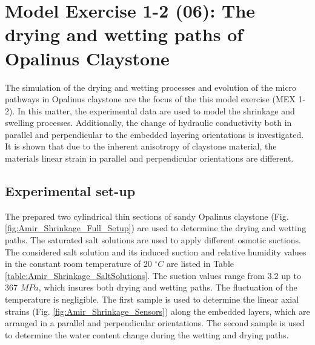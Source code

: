 \section{Model Exercise 1-2 (06): The drying and wetting paths of Opalinus Claystone}
\label{sec:mex06}

The simulation of the drying and wetting processes and evolution of the micro pathways in Opalinus claystone are the focus of the this model exercise (MEX 1-2). In this matter, the experimental data are used to model the shrinkage and swelling processes. Additionally, the change of hydraulic conductivity both in parallel and perpendicular to the embedded layering orientations is investigated. It is shown that due to the inherent anisotropy of claystone material, the materials linear strain in parallel and perpendicular orientations are different.  

\subsection{Experimental set-up}
The prepared two cylindrical thin sections of sandy Opalinus claystone (Fig. \ref{fig:Amir_Shrinkage_Full_Setup}) are used to determine the drying and wetting paths. The saturated salt solutions are used to apply different osmotic suctions. The considered salt solution and its induced suction and relative humidity values in the constant room temperature of 20 $^{\circ}C$ are listed in Table \ref{table:Amir_Shrinkage_SaltSolutions}. The suction values range from 3.2 up to 367 $MPa$, which insures both drying and wetting paths. The fluctuation of the temperature is negligible. The first sample is used to determine the linear axial strains (Fig. \ref{fig:Amir_Shrinkage_Sensors}) along the embedded layers, which are arranged in a parallel and perpendicular orientations. The second sample is used to determine the water content change during the wetting and drying paths.

